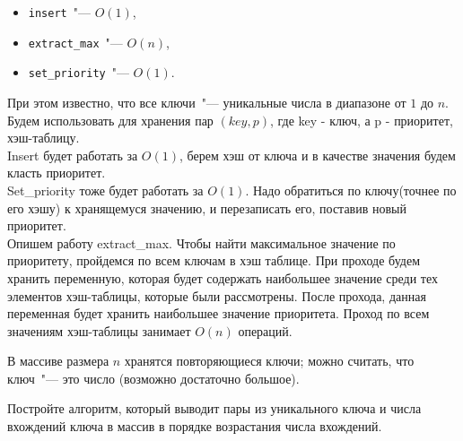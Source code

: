 \documentclass[12pt]{extreport}
\theoremstyle{definiton}
\theoremstyle{definition}
\theoremstyle{definition}
\newcounter{problem}
\newcounter{subproblem}
\def\PRSUBskip{
	\medskip
}
\def\prsub{\PRSUBskip\noindent\stepcounter{subproblem}{\sf \thesubproblem.}\;}
\def\prend{
	\medskip
}
\begin{document}
	 \begin{itemize}
	 	\item \texttt{insert}~"--- $O(1)$,
	 		\item \texttt{extract\_max}~"--- $O(n)$, 	\item \texttt{set\_priority}~"--- $O(1)$. 
	 \end{itemize}
При этом известно, что все ключи~"--- уникальные числа в диапазоне от $1$ до $n$.
    \newline
    \\ Будем использовать для хранения пар $(key,p)$, где key - ключ, а p - приоритет, хэш-таблицу.
    \\ Insert будет работать за $O(1)$, берем хэш от ключа и в качестве значения будем класть приоритет.
    \\ Set\_priority тоже будет работать за $O(1)$. Надо обратиться по ключу(точнее по его хэшу) к хранящемуся значению, и перезаписать его, поставив новый приоритет.
    \\ Опишем работу extract\_max. Чтобы найти максимальное значение по приоритету, пройдемся по всем ключам в хэш таблице. При проходе будем хранить переменную, которая будет содержать наибольшее значение среди тех элементов хэш-таблицы, которые были рассмотрены. После прохода, данная переменная будет хранить наибольшее значение приоритета. Проход по всем значениям хэш-таблицы занимает $O(n)$ операций.
	 \prend


	 \Pr[2+2] В массиве размера $n$ хранятся повторяющиеся ключи; можно считать, что ключ~"--- это число (возможно достаточно большое). 
	 
	 \prsub Постройте алгоритм, который выводит пары из уникального ключа и числа вхождений ключа в массив в порядке возрастания числа вхождений.
	 
\end{document}
